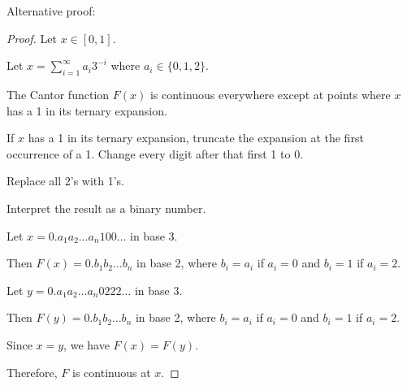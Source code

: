 Alternative proof:
\begin{proof}
Let $x \in [0,1]$.

Let $x = \sum_{i=1}^\infty a_i 3^{-i}$ where $a_i \in \{0,1,2\}$.

The Cantor function $F(x)$ is continuous everywhere except at points where $x$ has a 1 in its ternary expansion.

If $x$ has a 1 in its ternary expansion, truncate the expansion at the first occurrence of a 1. Change every digit after that first 1 to 0.

Replace all 2's with 1's.

Interpret the result as a binary number.

Let $x = 0.a_1 a_2 \dots a_n 1 0 0 \dots$ in base 3.

Then $F(x) = 0.b_1 b_2 \dots b_n$ in base 2, where $b_i = a_i$ if $a_i = 0$ and $b_i = 1$ if $a_i = 2$.

Let $y = 0.a_1 a_2 \dots a_n 0 2 2 2 \dots$ in base 3.

Then $F(y) = 0.b_1 b_2 \dots b_n$ in base 2, where $b_i = a_i$ if $a_i = 0$ and $b_i = 1$ if $a_i = 2$.

Since $x = y$, we have $F(x) = F(y)$.

Therefore, $F$ is continuous at $x$.
\end{proof}
